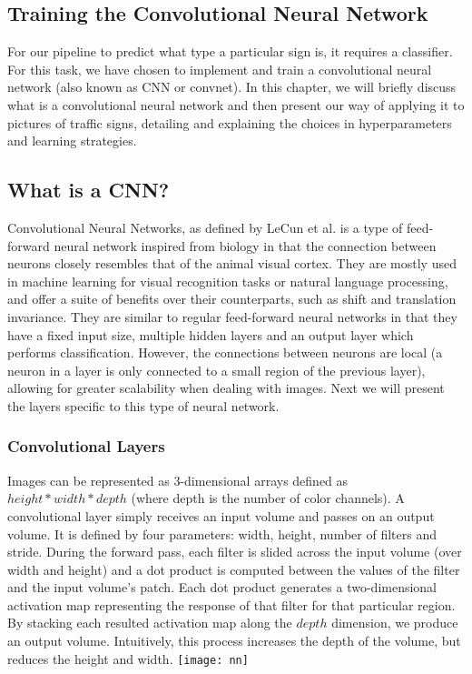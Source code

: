 \begin{center}
\chapter{Training the Convolutional Neural Network}
\end{center}
For our pipeline to predict what type a particular sign is, it requires a classifier. For this task, we have chosen to implement and train a convolutional neural network (also known as CNN or convnet).
In this chapter, we will briefly discuss what is a convolutional neural network and then present our way of applying it to pictures of traffic signs, detailing and explaining the choices in hyperparameters and learning strategies.

\section{What is a CNN?}
Convolutional Neural Networks, as defined by LeCun et al.\cite{cnnOriginal} is a type of feed-forward neural network inspired from biology in that the connection between neurons closely resembles that of the animal visual cortex. They are mostly used in machine learning for visual recognition tasks or natural language processing, and offer a suite of benefits over their counterparts, such as shift and translation invariance.
They are similar to regular feed-forward neural networks in that they have a fixed input size, multiple hidden layers and an output layer which performs classification. However, the connections between neurons are local (a neuron in a layer is only connected to a small region of the previous layer), allowing for greater scalability when dealing with images. Next we will present the layers specific to this type of neural network.
\subsection{Convolutional Layers}
Images can be represented as 3-dimensional arrays defined as $height*width*depth$ (where depth is the number of color channels). A convolutional layer simply receives an input volume and passes on an output volume. It is defined by four parameters: width, height, number of filters and stride. During the forward pass, each filter is slided across the input volume (over width and height) and a dot product is computed between the values of the filter and the input volume's patch. Each dot product generates a two-dimensional activation map representing the response of that filter for that particular region. By stacking each resulted activation map along the $depth$ dimension, we produce an output volume. Intuitively, this process increases the depth of the volume, but reduces the height and width.
\texttt{[image: nn]}

